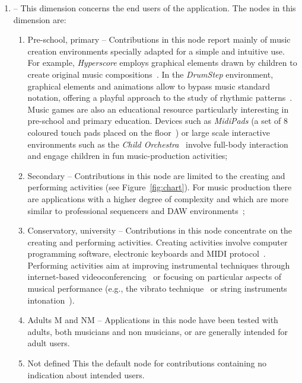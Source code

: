 \documentclass[journal]{IEEEtran}
\newcommand{\dimension}[1]{{\fontfamily{cmss}\selectfont {\textit{#1}}}}
\newcommand{\node}[1]{{\fontfamily{cmss}\selectfont #1}}
\begin{document}
\begin{enumerate}[label=3.\arabic*.,leftmargin=0.7cm,listparindent=-\leftmargin, start=0]
\item \dimension{Users} -- This dimension concerns the end users of the application. The nodes in this dimension are:
%
\begin{enumerate}[label=3.1.\arabic*.,leftmargin=0.9cm,listparindent=-\leftmargin, start=0]
%   
\item \node{Pre-school, primary} -- Contributions in this node report mainly of music creation environments specially adapted for a simple and intuitive use. For example, \textit{Hyperscore} employs graphical elements drawn by children to create original music compositions~\cite{farbood2004hyperscore}. In the \textit{DrumStep} environment, graphical elements and animations allow to bypass music standard notation, offering a playful approach to the study of rhythmic patterns~\cite{McCarthy}. Music games are also an educational resource particularly interesting in pre-school and primary education. Devices such as \textit{MidiPads} (a set of 8 coloured touch pads placed on the floor~\cite{mcdowall2003music}) or large scale interactive environments such as the \textit{Child Orchestra}~\cite{core} involve full-body interaction and engage children in fun music-production activities;
%              
\item \node{Secondary} -- Contributions in this node are limited to the creating and performing activities (see Figure~\ref{fig:chart}). For music production there are applications with a higher degree of complexity and which are more similar to professional sequencers and DAW environments~\cite{dillon2003,mellor};
%
\item \node{Conservatory, university} -- Contributions in this node concentrate on the creating and performing activities. Creating activities involve computer programming software, electronic keyboards and MIDI protocol~\cite{airy}. Performing activities aim at improving instrumental techniques through internet-based videoconferencing~\cite{dammers} or focusing on particular aspects of musical performance (e.g., the vibrato technique~\cite{ho} or string instruments intonation~\cite{hopkins2014pilot}).
%
\item \node{Adults M and NM} -- Applications in this node  have been tested with adults, both musicians and non musicians, or are generally intended for adult users.
%
\item \node{Not defined} This the default node for contributions containing no indication about intended users. 
\end{enumerate}


\end{enumerate}
\end{document}
